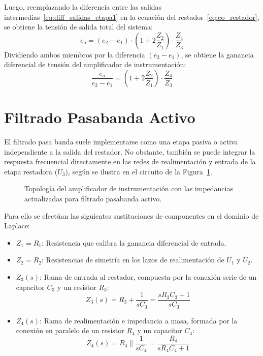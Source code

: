 Luego, reemplazando la diferencia entre las salidas intermedias~\eqref{eq:diff_salidas_etapa1} en la ecuación del restador~\eqref{eq:eo_restador}, se obtiene la tensión de salida total del sistema:
\begin{equation*}
  e_o = (e_2 - e_1) \cdot \left(1 + 2 \frac{Z_2}{Z_1}\right) \cdot \frac{Z_4}{Z_3}
\end{equation*}
Dividiendo ambos miembros por la diferencia $(e_2 - e_1)$, se obtiene la ganancia diferencial de tensión del amplificador de instrumentación:
\begin{equation*}
  \frac{e_o}{e_2 - e_1} = \left(1 + 2 \frac{Z_2}{Z_1}\right) \cdot \frac{Z_4}{Z_3}
\end{equation*}

\section{Filtrado Pasabanda Activo}

El filtrado pasa banda suele implementarse como una etapa pasiva o activa independiente
a la salida del restador. No obstante, también se puede integrar la respuesta frecuencial
directamente en las redes de realimentación y entrada de la etapa restadora ($U_3$), según se ilustra en el circuito de
la Figura~\ref{crkt:sustitucion_z}.

\begin{figure}[!ht]
  \centering
  \resizebox{0.75\textwidth}{!}{%
    }
  \caption{Topología del amplificador de instrumentación con las impedancias actualizadas para filtrado pasabanda activo.}
  \label{crkt:sustitucion_z}
\end{figure}

Para ello se efectúan las siguientes sustituciones de componentes en el dominio de Laplace:
\begin{itemize}
  \item $Z_1 = R_1$: Resistencia que calibra la ganancia diferencial de entrada.
  \item $Z_2 = R_2$: Resistencias de simetría en los lazos de realimentación de $U_1$ y $U_2$.
  \item $Z_3(s)$: Rama de entrada al restador, compuesta por la conexión serie de un capacitor $C_3$ y un resistor $R_3$:
  \begin{equation}
    Z_3(s) = R_3 + \frac{1}{s C_3} = \frac{s R_3 C_3 + 1}{s C_3}
    \label{eq:z3_s}
  \end{equation}
  \item $Z_4(s)$: Rama de realimentación e impedancia a masa, formada por la conexión en paralelo de un resistor $R_4$ y
  un capacitor $C_4$:
  \begin{equation}
    Z_4(s) = R_4 \parallel \frac{1}{s C_4} = \frac{R_4}{s R_4 C_4 + 1}
    \label{eq:z4_s}
  \end{equation}
\end{itemize}

